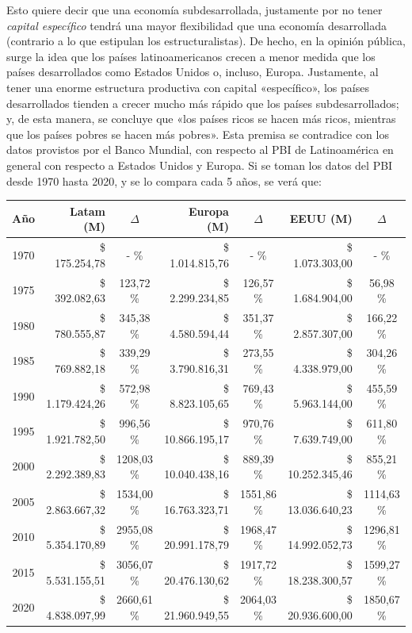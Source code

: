 \documentclass[12pt,a4paper,twoside]{book}
\begin{document}
Esto quiere decir que una economía subdesarrollada, justamente por no tener \textit{capital específico} tendrá una mayor flexibilidad que una economía desarrollada (contrario a lo que estipulan los estructuralistas). De hecho, en la opinión pública, surge la idea que los países latinoamericanos crecen a menor medida que los países desarrollados como Estados Unidos o, incluso, Europa. Justamente, al tener una enorme estructura productiva con capital «específico», los países desarrollados tienden a crecer mucho más rápido que los países subdesarrollados; y, de esta manera, se concluye que «los países ricos se hacen más ricos, mientras que los países pobres se hacen más pobres». Esta premisa se contradice con los datos provistos por el Banco Mundial, con respecto al PBI de Latinoamérica en general con respecto a Estados Unidos y Europa. Si se toman los datos del PBI desde 1970 hasta 2020, y se lo compara cada 5 años, se verá que:

\begin{center}
\begin{scriptsize}
\begin{longtable}{|c|r|c|r|c|r|c|}
\hline
\textbf{Año} & \textbf{Latam (M)} & \textbf{$ \Delta $} & \textbf{Europa (M)} & \textbf{$ \Delta $} & \textbf{EEUU (M)} & \textbf{$ \Delta $} \\ \hline
1970 & \$ 175.254,78 & - \% & \$ 1.014.815,76 & - \% & \$ 1.073.303,00 & - \% \\ \hline
1975 & \$ 392.082,63 & 123,72 \% & \$ 2.299.234,85 & 126,57 \% & \$ 1.684.904,00 & 56,98 \% \\ \hline
1980 & \$ 780.555,87 & 345,38 \% & \$ 4.580.594,44 & 351,37 \% & \$ 2.857.307,00 & 166,22 \% \\ \hline
1985 & \$ 769.882,18 & 339,29 \% & \$ 3.790.816,31 & 273,55 \% & \$ 4.338.979,00 & 304,26 \% \\ \hline
1990 & \$ 1.179.424,26 & 572,98 \% & \$ 8.823.105,65 & 769,43 \% & \$ 5.963.144,00 & 455,59 \% \\ \hline
1995 & \$ 1.921.782,50 & 996,56 \% & \$ 10.866.195,17 & 970,76 \% & \$ 7.639.749,00 & 611,80 \% \\ \hline
2000 & \$ 2.292.389,83 & 1208,03 \% & \$ 10.040.438,16 & 889,39 \% & \$ 10.252.345,46 & 855,21 \% \\ \hline
2005 & \$ 2.863.667,32 & 1534,00 \% & \$ 16.763.323,71 & 1551,86 \% & \$ 13.036.640,23 & 1114,63 \% \\ \hline
2010 & \$ 5.354.170,89 & 2955,08 \% & \$ 20.991.178,79 & 1968,47 \% & \$ 14.992.052,73 & 1296,81 \% \\ \hline
2015 & \$ 5.531.155,51 & 3056,07 \% & \$ 20.476.130,62 & 1917,72 \% & \$ 18.238.300,57 & 1599,27 \% \\ \hline
2020 & \$ 4.838.097,99 & 2660,61 \% & \$ 21.960.949,55 & 2064,03 \% & \$ 20.936.600,00 & 1850,67 \% \\ \hline
\end{longtable}
\end{scriptsize}
\end{center}
\end{document}
